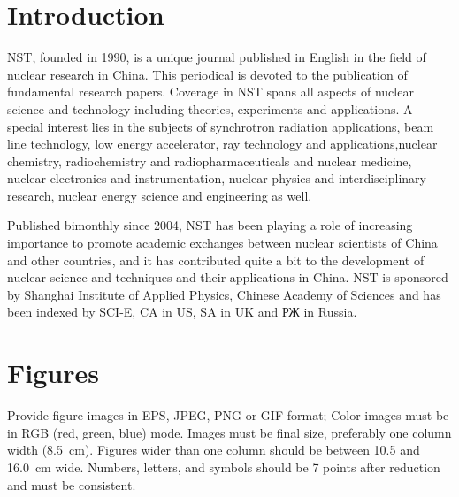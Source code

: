 \documentclass[submitting]{nst}
\begin{document}

\maketitle


\section{Introduction}

NST, founded in 1990, is a unique journal published in English in the field of nuclear research in China. This periodical is devoted to the publication of fundamental research papers. Coverage in NST spans all aspects of nuclear science and technology including theories, experiments and applications. A special interest lies in the subjects of synchrotron radiation applications, beam line technology, low energy accelerator, ray technology and applications,nuclear chemistry, radiochemistry and radiopharmaceuticals and nuclear medicine, nuclear electronics and instrumentation, nuclear physics and interdisciplinary research, nuclear energy science and engineering as well.

Published bimonthly since 2004, NST has been playing a role of increasing importance to promote academic exchanges between nuclear scientists of China and other countries, and it has contributed quite a bit to the development of nuclear science and techniques and their applications in China. NST is sponsored by Shanghai Institute of Applied Physics, Chinese Academy of Sciences and has been indexed by SCI-E, CA in US, SA in UK and \foreignlanguage{russian}{РЖ} in Russia.


\section{Figures}\label{sec:artwork}

Provide figure images in EPS, JPEG, PNG or GIF format; Color images must be in RGB (red, green, blue) mode. Images must be final size, preferably one column width (\SI{8.5}{\centi\metre}). Figures wider than one column should be between 10.5 and \SI{16.0}{\centi\metre} wide. Numbers, letters, and symbols should be 7 points after reduction and must be consistent.
 
\end{document}
